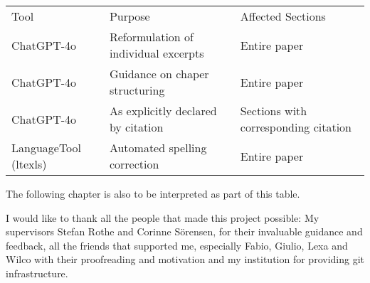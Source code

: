 \begin{table}[H]
    \begin{tabular}{lll}
        Tool & Purpose & Affected Sections \\
        ChatGPT-4o & Reformulation of individual excerpts & Entire paper \\
        ChatGPT-4o & Guidance on chaper structuring & Entire paper \\
        ChatGPT-4o & As explicitly declared by citation & Sections with corresponding citation \\
        LanguageTool (ltexls) & Automated spelling correction & Entire paper \\
    \end{tabular}

\end{table}
The following chapter is also to be interpreted as part of this table.

\begingroup
\renewcommand{\cleardoublepage}{}
\renewcommand{\clearpage}{}
\label{chap:ack}
\endgroup
I would like to thank all the people that made this project possible: My supervisors Stefan Rothe and Corinne Sörensen, for their invaluable guidance and feedback, all the friends that supported me, especially Fabio, Giulio, Lexa and Wilco with their proofreading and motivation and my institution for providing git infrastructure.
